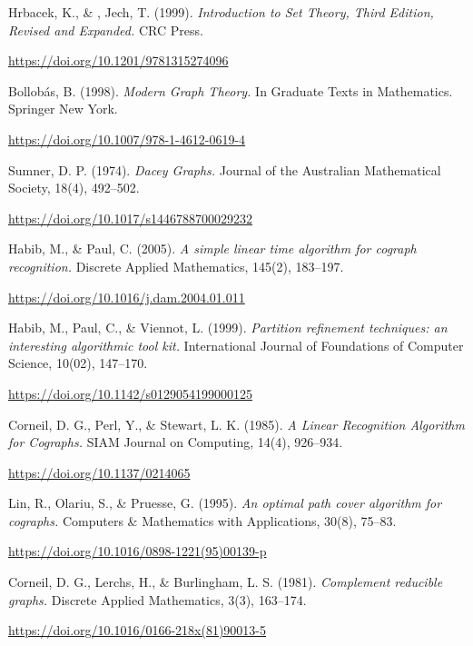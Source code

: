
\begin{thebibliography}{99}

     Hrbacek, K., \& , Jech, T. (1999).
    \textit{Introduction to Set Theory, Third Edition, Revised and Expanded.} CRC Press.

    \url{https://doi.org/10.1201/9781315274096}

     Bollobás, B. (1998).
    \textit{Modern Graph Theory.}
    In Graduate Texts in Mathematics. Springer New York.

    \url{https://doi.org/10.1007/978-1-4612-0619-4}

     Sumner, D. P. (1974).
    \textit{Dacey Graphs.}
    Journal of the Australian Mathematical Society, 18(4), 492–502.

    \url{https://doi.org/10.1017/s1446788700029232}

     Habib, M., \& Paul, C. (2005).
    \textit{A simple linear time algorithm for cograph recognition.}
    Discrete Applied Mathematics, 145(2), 183–197.

    \url{https://doi.org/10.1016/j.dam.2004.01.011}

     Habib, M., Paul, C., \& Viennot, L. (1999).
    \textit{Partition refinement techniques: an interesting algorithmic tool kit.}
    International Journal of Foundations of Computer Science, 10(02), 147–170.

    \url{https://doi.org/10.1142/s0129054199000125}

     Corneil, D. G., Perl, Y., \& Stewart, L. K. (1985).
    \textit{A Linear Recognition Algorithm for Cographs.}
    SIAM Journal on Computing, 14(4), 926–934.

    \url{https://doi.org/10.1137/0214065}

     Lin, R., Olariu, S., \& Pruesse, G. (1995).
    \textit{An optimal path cover algorithm for cographs.}
    Computers \& Mathematics with Applications, 30(8), 75–83.

    \url{https://doi.org/10.1016/0898-1221(95)00139-p}

     Corneil, D. G., Lerchs, H., \& Burlingham, L. S. (1981).
    \textit{Complement reducible graphs.}
    Discrete Applied Mathematics, 3(3), 163–174.

    \url{https://doi.org/10.1016/0166-218x(81)90013-5}


\end{thebibliography}
